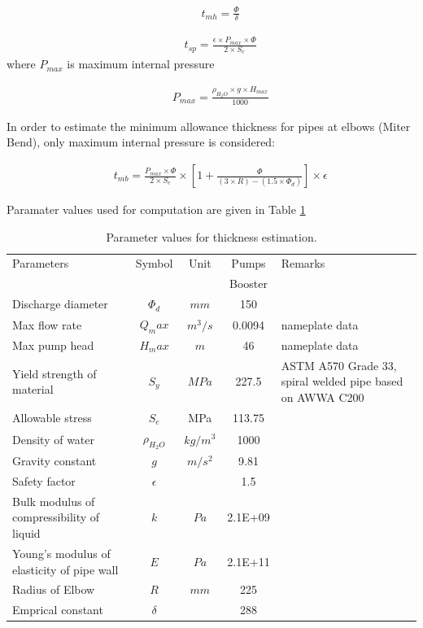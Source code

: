 \begin{eqnarray}
&& t_{mh} = \frac{\Phi}{\delta} \label{ch05thickness01}
\end{eqnarray}

\begin{eqnarray}
&& t_{sp} = \frac{\epsilon\times P_{max} \times \Phi}{2 \times S_e} \label{ch05thickness02}
\end{eqnarray}
where $P_{max}$ is maximum internal pressure

\begin{eqnarray}
&& P_{max} = \frac{\rho_{H_2O} \times g \times H_{max}}{1000} \label{ch05thickness03}
\end{eqnarray}

In order to estimate the minimum allowance thickness for pipes at elbows (Miter Bend), only maximum internal pressure is considered:

\begin{eqnarray}
&& t_{mb} = \frac{P_{max} \times \Phi}{2 \times S_e} \times \left[ 1 + \frac{\Phi}{(3 \times R)-(1.5 \times \Phi_d)}\right]\times \epsilon \label{ch05thickness04}
\end{eqnarray}

Paramater values used for computation are given in Table \ref{ch05_tbl_thicknesscalc}

\begin{table}[h]
\caption{Parameter values for thickness estimation.}
\label{ch05_tbl_thicknesscalc}
{\footnotesize
\begin{tabular}{p{4cm}|c|c|c|p{4cm}}

\hline
Parameters & Symbol & Unit & Pumps & Remarks \\ 
\cline{4-4}
&  &  & Booster &  \\ 
\hline
Discharge diameter & $\Phi_d$ & $mm$ & 150 &  \\ 
Max flow rate & $Q_max$ & $m^3/s$ & 0.0094 & nameplate data \\ 
Max pump head & $H_max$ & $m$ & 46 & nameplate data \\ 
Yield strength of material & $S_y$ & $MPa$ & 227.5 & ASTM A570 Grade 33, spiral welded pipe based on AWWA C200 \\ 
Allowable stress & $S_e$ & MPa & 113.75 &  \\ 
Density of water & $\rho_{H_2O}$ & $kg/m^3$ & 1000 &  \\ 
Gravity constant & $g$ & $m/s^2$ & 9.81 &  \\ 
Safety factor & $\epsilon$ &  & 1.5 &  \\ 
Bulk modulus of compressibility of liquid & $k$ & $Pa$ & 2.1E+09 &  \\ 
Young's modulus of elasticity of pipe wall & $E$ & $Pa$ & 2.1E+11 &  \\ 
Radius of Elbow & $R$ & $mm$ & 225 &  \\ 
Emprical constant & $\delta$ &  & 288 &  \\ 
\hline
\end{tabular}

}
\end{table}

